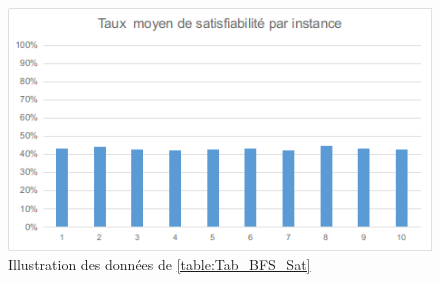 \begin{figure}[H]
	\includegraphics[width=\textwidth]{images/BFSUF75Graph.png}
	\caption{Illustration des données de \ref{table:Tab_BFS_Sat}}
\end{figure}
\newpage
